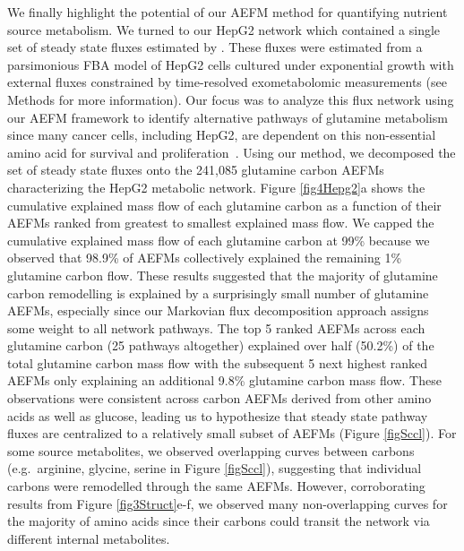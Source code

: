 \documentclass[12pt]{article}
\begin{document}
We finally highlight the potential of our AEFM method for quantifying
nutrient source metabolism. We turned to our HepG2 network which contained
a single set of steady state fluxes estimated by
\citeauthor{NilssonAvlant2020Qaoa}. These fluxes were estimated from
a parsimonious FBA model of HepG2 cells cultured under exponential growth
with external fluxes constrained by time-resolved exometabolomic
measurements (see Methods for more information). Our focus was to analyze
this flux network using our AEFM framework to identify alternative
pathways of glutamine metabolism since many cancer cells, including HepG2,
are dependent on this non-essential amino acid for survival and
proliferation~\citep{YeYanyan2023Gmri,YooHeeChan2020Gric}. Using our
method, we decomposed the set of steady state fluxes onto the 241,085
glutamine carbon AEFMs characterizing the HepG2 metabolic network. Figure
\ref{fig4Hepg2}a shows the cumulative explained mass flow of each
glutamine carbon as a function of their AEFMs ranked from greatest to
smallest explained mass flow. We capped the cumulative explained mass flow
of each glutamine carbon at 99\% because we observed that 98.9\% of AEFMs
collectively explained the remaining 1\% glutamine carbon flow. These
results suggested that the majority of glutamine carbon remodelling is
explained by a surprisingly small number of glutamine AEFMs, especially
since our Markovian flux decomposition approach assigns some weight to all
network pathways. The top 5 ranked AEFMs across each glutamine carbon (25
pathways altogether) explained over half (50.2\%) of the total glutamine
carbon mass flow with the subsequent 5 next highest ranked AEFMs only
explaining an additional 9.8\% glutamine carbon mass flow. These
observations were consistent across carbon AEFMs derived from other amino
acids as well as glucose, leading us to hypothesize that steady state
pathway fluxes are centralized to a relatively small subset of AEFMs
(Figure \ref{figSccl}). For some source metabolites, we observed
overlapping curves between carbons (e.g.\ arginine, glycine, serine in
Figure \ref{figSccl}), suggesting that individual carbons were remodelled
through the same AEFMs. However, corroborating results from Figure
\ref{fig3Struct}e-f, we observed many non-overlapping curves for the
majority of amino acids since their carbons could transit the network via
different internal metabolites.

\end{document}
